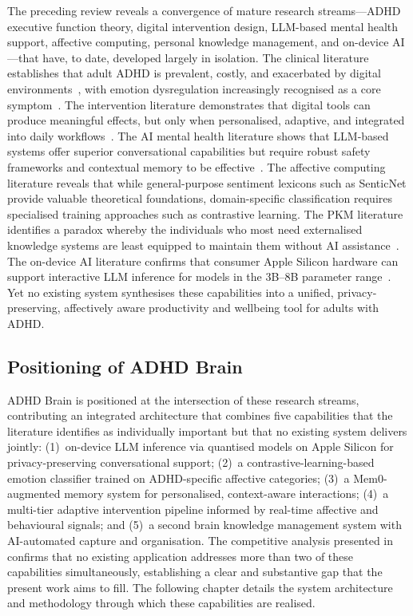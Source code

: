 The preceding review reveals a convergence of mature research streams---ADHD executive function theory, digital intervention design, LLM-based mental health support, affective computing, personal knowledge management, and on-device AI---that have, to date, developed largely in isolation. The clinical literature establishes that adult ADHD is prevalent, costly, and exacerbated by digital environments~\cite{faraone2021, barkley2010, thorell2022}, with emotion dysregulation increasingly recognised as a core symptom~\cite{beattie2025}. The intervention literature demonstrates that digital tools can produce meaningful effects, but only when personalised, adaptive, and integrated into daily workflows~\cite{garciaperal2025, elbe2023, storetvedt2024}. The AI mental health literature shows that LLM-based systems offer superior conversational capabilities but require robust safety frameworks and contextual memory to be effective~\cite{yuan2025, boit2025, sharma2024}. The affective computing literature reveals that while general-purpose sentiment lexicons such as SenticNet provide valuable theoretical foundations, domain-specific classification requires specialised training approaches such as contrastive learning. The PKM literature identifies a paradox whereby the individuals who most need externalised knowledge systems are least equipped to maintain them without AI assistance~\cite{forte2022, ferreira2025}. The on-device AI literature confirms that consumer Apple Silicon hardware can support interactive LLM inference for models in the 3B--8B parameter range~\cite{ajayi2025, barrios2025, cai2026}. Yet no existing system synthesises these capabilities into a unified, privacy-preserving, affectively aware productivity and wellbeing tool for adults with ADHD.

\subsection{Positioning of ADHD Brain}
\label{sec:litrev_positioning}

ADHD Brain is positioned at the intersection of these research streams, contributing an integrated architecture that combines five capabilities that the literature identifies as individually important but that no existing system delivers jointly: (1)~on-device LLM inference via quantised models on Apple Silicon for privacy-preserving conversational support; (2)~a contrastive-learning-based emotion classifier trained on ADHD-specific affective categories; (3)~a Mem0-augmented memory system for personalised, context-aware interactions; (4)~a multi-tier adaptive intervention pipeline informed by real-time affective and behavioural signals; and (5)~a second brain knowledge management system with AI-automated capture and organisation. The competitive analysis presented in  confirms that no existing application addresses more than two of these capabilities simultaneously, establishing a clear and substantive gap that the present work aims to fill. The following chapter details the system architecture and methodology through which these capabilities are realised.
